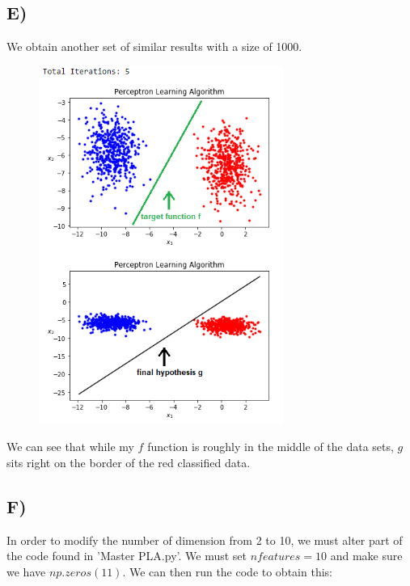 \documentclass[a4paper]{article}
\begin{document}
\newpage

\subsection{E)}
We obtain another set of similar results with a size of 1000.

\begin{figure}[h]
  \begin{center}
    \includegraphics[width=80mm,scale=0.8]{problem14E.png}
  \end{center}
\end{figure}
We can see that while my $f$ function is roughly in the middle of the data sets, $g$ sits right on the border of the red classified data.

\newpage

\subsection{F)}
In order to modify the number of dimension from 2 to 10, we must alter part of the code found in 'Master PLA.py'. We must set $n features=10$ and make sure we have $np.zeros(11)$. We can then run the code to obtain this:
\end{document}
